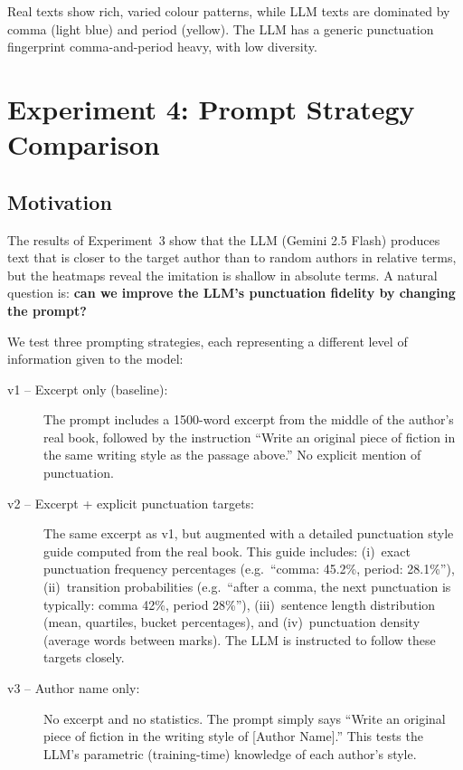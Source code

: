 \documentclass{article}
\begin{document}
Real texts show rich, varied colour patterns, while LLM texts are dominated by comma (light blue) and period (yellow). The LLM has a generic punctuation fingerprint comma-and-period heavy, with low diversity.

\section{Experiment 4: Prompt Strategy Comparison}

\subsection{Motivation}

The results of Experiment~3 show that the LLM (Gemini 2.5 Flash) produces text that is closer to the target author than to random authors in relative terms, but the heatmaps reveal the imitation is shallow in absolute terms. A natural question is: \textbf{can we improve the LLM's punctuation fidelity by changing the prompt?}

We test three prompting strategies, each representing a different level of information given to the model:

\begin{description}
    \item[v1 -- Excerpt only (baseline):] The prompt includes a 1500-word excerpt from the middle of the author's real book, followed by the instruction ``Write an original piece of fiction in the same writing style as the passage above.'' No explicit mention of punctuation.
    \item[v2 -- Excerpt + explicit punctuation targets:] The same excerpt as v1, but augmented with a detailed punctuation style guide computed from the real book. This guide includes: (i)~exact punctuation frequency percentages (e.g.\ ``comma: 45.2\%, period: 28.1\%''), (ii)~transition probabilities (e.g.\ ``after a comma, the next punctuation is typically: comma 42\%, period 28\%''), (iii)~sentence length distribution (mean, quartiles, bucket percentages), and (iv)~punctuation density (average words between marks). The LLM is instructed to follow these targets closely.
    \item[v3 -- Author name only:] No excerpt and no statistics. The prompt simply says ``Write an original piece of fiction in the writing style of [Author Name].'' This tests the LLM's parametric (training-time) knowledge of each author's style.
\end{description}
\end{document}
